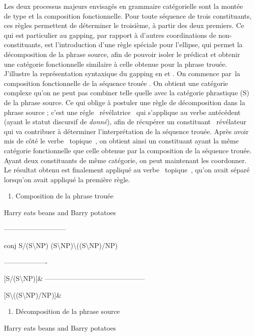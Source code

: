 Les deux processus majeurs envisagés en grammaire catégorielle sont la montée de type et la composition fonctionnelle. Pour toute séquence de trois constituants, ces règles permettent de déterminer le troisième, à partir des deux premiers. Ce qui est particulier au gapping, par rapport à d'autres coordinations de non-constituants, est l'introduction d'une règle spéciale pour l'ellipse, qui permet la décomposition de la phrase source, afin de pouvoir isoler le prédicat et obtenir une catégorie fonctionnelle similaire à celle obtenue pour la phrase trouée. J'illustre la représentation syntaxique du gapping en  et . On commence par~la composition fonctionnelle de la séquence trouée . On obtient une catégorie complexe qu'on ne peut pas combiner telle quelle avec la catégorie phrastique (S) de la phrase source. Ce qui oblige à postuler une règle de décomposition dans la phrase source  ; c'est une régle {\guillemotleft}~révélatrice~{\guillemotright} qui s'applique au verbe antécédent (ayant le statut discursif de \textit{donné}), afin de récupérer un constituant {\guillemotleft}~révélateur~{\guillemotright} qui va contribuer à déterminer l'interprétation de la séquence trouée. Après avoir mis de côté le verbe {\guillemotleft}~topique~{\guillemotright}, on obtient ainsi un constituant ayant la même catégorie fonctionnelle que celle obtenue par la composition de la séquence trouée. Ayant deux constituants de même catégorie, on peut maintenant les coordonner. Le résultat obtenu est finalement appliqué au verbe {\guillemotleft}~topique~{\guillemotright}, qu'on avait séparé lorsqu'on avait appliqué la première règle.


\begin{enumerate}
\item \label{bkm:Ref289877875}Composition de la phrase trouée  


\end{enumerate}
  Harry eats beans and  Barry    potatoes

          ---------------------------

      conj  S/(S{\textbackslash}NP) (S{\textbackslash}NP){\textbackslash}((S{\textbackslash}NP)/NP)  

 -------------------

 [S/(S{\textbackslash}NP)]\& --------------------------------------------

         [S{\textbackslash}((S{\textbackslash}NP)/NP)]\& \begin{enumerate}
\item \label{bkm:Ref289877878}Décomposition de la phrase source  


\end{enumerate}
  Harry  eats  beans      and Barry potatoes

